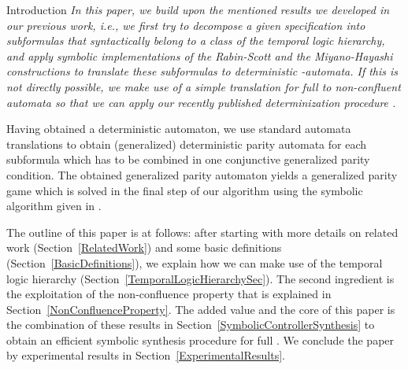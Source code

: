 \documentclass[copyright,creativecommons]{eptcs}
\begin{document}
\begin{section}{Introduction}
{\em In this paper, we build upon the mentioned results we developed in our previous work, i.e., we first try to  decompose a given specification into subformulas that syntactically belong to a class of the temporal logic hierarchy, and apply symbolic implementations of the Rabin-Scott and the Miyano-Hayashi constructions to translate these subformulas to deterministic -automata. If this is not directly possible, we make use of a simple translation for full  to non-confluent automata so that we can apply our recently published determinization procedure \cite{MoSc08}.}

Having obtained a deterministic automaton, we use standard automata translations to obtain (generalized) deterministic parity automata for each subformula which has to be combined in one conjunctive generalized parity condition. The obtained generalized parity automaton yields a generalized parity game which is solved in the final step of our algorithm using the symbolic algorithm given in \cite{ChHP07}.

The outline of this paper is at follows: after starting with more details on related work (Section~\ref{RelatedWork}) and some basic definitions (Section~\ref{BasicDefinitions}), we explain how we can make use of the temporal logic hierarchy (Section~\ref{TemporalLogicHierarchySec}). The second ingredient is the exploitation of the non-confluence property that is explained in Section~\ref{NonConfluenceProperty}. The added value and the core of this paper is the combination of these results in Section~\ref{SymbolicControllerSynthesis} to obtain an efficient symbolic synthesis procedure for full . We conclude the paper by experimental results in Section~\ref{ExperimentalResults}.
\end{section}
\end{document}
